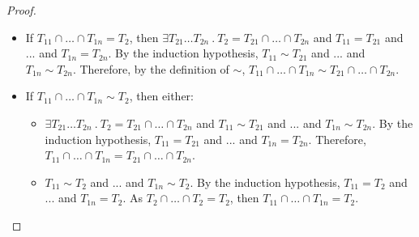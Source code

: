 \documentclass[a4paper]{article}
\begin{document}
\begin{proof}
\begin{itemize}
    \begin{itemize}
        \item If $T_{11} \cap \ldots \cap T_{1n} = T_2$, then $\exists T_{21} \ldots T_{2n}\ .\ T_2 = T_{21} \cap \ldots \cap T_{2n}$ and $T_{11} = T_{21}$ and ... and $T_{1n} = T_{2n}$.
        By the induction hypothesis, $T_{11} \sim T_{21}$ and ... and $T_{1n} \sim T_{2n}$.
        Therefore, by the definition of $\sim$, $T_{11} \cap \ldots \cap T_{1n} \sim T_{21} \cap \ldots \cap T_{2n}$.
        \item If $T_{11} \cap \ldots \cap T_{1n} \sim T_2$, then either:
        \begin{itemize}
            \item $\exists T_{21} \ldots T_{2n}\ .\ T_2 = T_{21} \cap \ldots \cap T_{2n}$ and $T_{11} \sim T_{21}$ and ... and $T_{1n} \sim T_{2n}$.
            By the induction hypothesis, $T_{11} = T_{21}$ and ... and $T_{1n} = T_{2n}$.
            Therefore, $T_{11} \cap \ldots \cap T_{1n} = T_{21} \cap \ldots \cap T_{2n}$.
            \item $T_{11} \sim T_2$ and ... and $T_{1n} \sim T_2$.
            By the induction hypothesis, $T_{11} = T_2$ and ... and $T_{1n} = T_2$.
            As $T_2 \cap \ldots \cap T_2 = T_2$, then $T_{11} \cap \ldots \cap T_{1n} = T_2$.
        \end{itemize}
    \end{itemize}
\end{itemize}
\end{proof}
\end{document}
